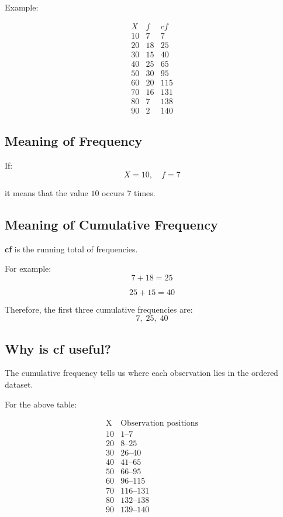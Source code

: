 \documentclass[12pt,a4paper]{article}
\begin{document}
Example:

\[
\begin{array}{c|c|c}
X&f&cf\\
\hline
10&7&7\\
20&18&25\\
30&15&40\\
40&25&65\\
50&30&95\\
60&20&115\\
70&16&131\\
80&7&138\\
90&2&140
\end{array}
\]

\subsection*{Meaning of Frequency}

If:
\[
X=10,\quad f=7
\]

it means that the value $10$ occurs $7$ times.

\subsection*{Meaning of Cumulative Frequency}

\textbf{cf} is the running total of frequencies.

For example:
\[
7+18=25
\]

\[
25+15=40
\]

Therefore, the first three cumulative frequencies are:
\[
7,\;25,\;40
\]

\subsection*{Why is cf useful?}

The cumulative frequency tells us where each observation lies in the ordered dataset.

For the above table:

\[
\begin{array}{c|c}
\text{X}&\text{Observation positions}\\
\hline
10&1\text{--}7\\
20&8\text{--}25\\
30&26\text{--}40\\
40&41\text{--}65\\
50&66\text{--}95\\
60&96\text{--}115\\
70&116\text{--}131\\
80&132\text{--}138\\
90&139\text{--}140
\end{array}
\]
\end{document}

